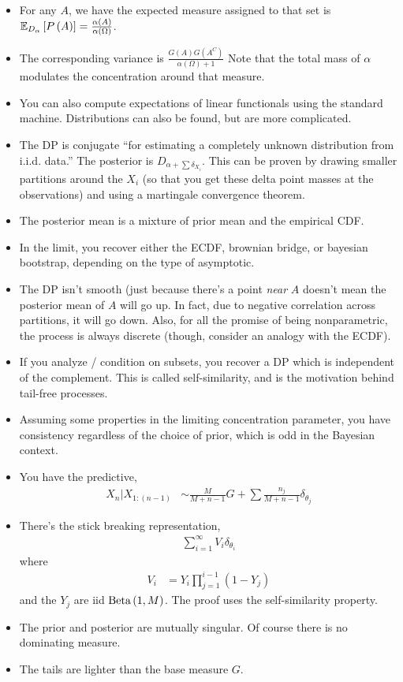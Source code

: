 \documentclass{article}
\begin{document}
\begin{itemize}
\item For any $A$, we have the expected measure assigned to that set is
  $\mathbb{E}_{D_{\alpha}}\left[{P\left(A\right)}\right] = \frac{\alpha\left(A\right)}{\alpha\left(\Omega\right)}$.
\item The corresponding variance is $\frac{G\left(A\right)G\left(A^{C}\right)}{\alpha\left(\Omega\right) + 1}$
  Note that the total mass of $\alpha$ modulates the concentration around that measure.
\item You can also compute expectations of linear functionals using the standard
  machine. Distributions can also be found, but are more complicated.
\item The DP is conjugate ``for estimating a completely unknown distribution
  from i.i.d. data.'' The posterior is $D_{\alpha + \sum \delta_{X_{i}}}$. This
  can be proven by drawing smaller partitions around the $X_{i}$ (so that you
  get these delta point masses at the observations) and using a martingale
  convergence theorem.
\item The posterior mean is a mixture of prior mean and the empirical CDF.
\item In the limit, you recover either the ECDF, brownian bridge, or bayesian
  bootstrap, depending on the type of asymptotic.
\item The DP isn't smooth (just because there's a point \textit{near} $A$
  doesn't mean the posterior mean of $A$ will go up. In fact, due to negative
  correlation across partitions, it will go down. Also, for all the promise of
  being nonparametric, the process is always discrete (though, consider an
  analogy with the ECDF).
\item If you analyze / condition on subsets, you recover a DP which is
  independent of the complement. This is called self-similarity, and is the
  motivation behind tail-free processes.
\item Assuming some properties in the limiting concentration parameter, you have
  consistency regardless of the choice of prior, which is odd in the Bayesian
  context.
\item You have the predictive,
  \begin{align*}
    X_{n} \vert X_{1:(n - 1)} &\sim \frac{M}{M + n - 1}G + \sum \frac{n_{j}}{M + n - 1} \delta_{\theta_{j}}
  \end{align*}
\item There's the stick breaking representation,
\begin{align*}
  \sum_{i = 1}^{\infty} V_{i}\delta_{\theta_{i}}
\end{align*}
where
\begin{align*}
  V_{i} &= Y_{i}\prod_{j = 1}^{i - 1}\left(1 - Y_{j}\right)
\end{align*}
and the $Y_{j}$ are iid $\textnormal{Beta}\left(1, M\right)$. The proof uses the
self-similarity property.
\item The prior and posterior are mutually singular. Of course there is no
  dominating measure.
\item The tails are lighter than the base measure $G$.
\end{itemize}
\end{document}
